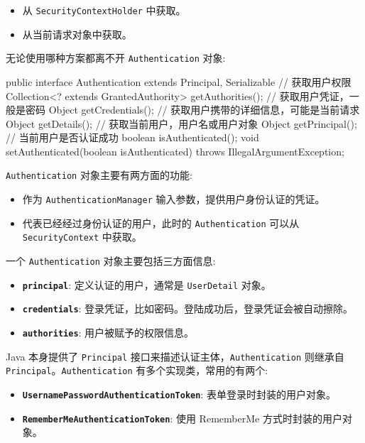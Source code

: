 \begin{itemize}
  \item 从 \texttt{SecurityContextHolder} 中获取。
  \item 从当前请求对象中获取。
\end{itemize}

无论使用哪种方案都离不开 \texttt{Authentication} 对象:

\begin{Java}
public interface Authentication extends Principal, Serializable {
    // 获取用户权限
    Collection<? extends GrantedAuthority> getAuthorities();
    // 获取用户凭证，一般是密码
    Object getCredentials();
    // 获取用户携带的详细信息，可能是当前请求
    Object getDetails();
    // 获取当前用户，用户名或用户对象
    Object getPrincipal();
    // 当前用户是否认证成功
    boolean isAuthenticated();
    void setAuthenticated(boolean isAuthenticated) throws IllegalArgumentException;
}
\end{Java}

\texttt{Authentication} 对象主要有两方面的功能:
\begin{itemize}
  \item 作为 \texttt{AuthenticationManager} 输入参数，提供用户身份认证的凭证。
  \item 代表已经经过身份认证的用户，此时的 \texttt{Authentication} 可以从 \texttt{SecurityContext} 中获取。
\end{itemize}

一个 \texttt{Authentication} 对象主要包括三方面信息:
\begin{itemize}
  \item \textbf{\texttt{principal}}: 定义认证的用户，通常是 \texttt{UserDetail} 对象。
  \item \textbf{\texttt{credentials}}: 登录凭证，比如密码。登陆成功后，登录凭证会被自动擦除。
  \item \textbf{\texttt{authorities}}: 用户被赋予的权限信息。
\end{itemize}

Java 本身提供了 \texttt{Principal} 接口来描述认证主体，\texttt{Authentication} 则继承自 \texttt{Principal}。\texttt{Authentication} 有多个实现类，常用的有两个:

\begin{itemize}
  \item \textbf{\texttt{UsernamePasswordAuthenticationToken}}: 表单登录时封装的用户对象。
  \item \textbf{\texttt{RememberMeAuthenticationToken}}: 使用 RememberMe 方式时封装的用户对象。
\end{itemize}


